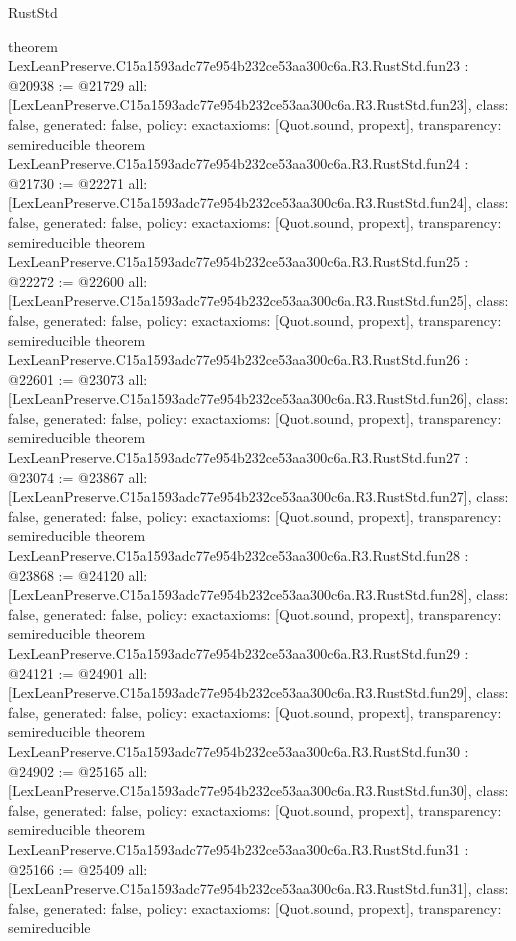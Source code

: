 \begin{lexlean}{RustStd}
\begin{coremodule}
{}
theorem LexLeanPreserve.C15a1593adc77e954b232ce53aa300c6a.R3.RustStd.fun23 : @20938 := @21729 {
  all: [LexLeanPreserve.C15a1593adc77e954b232ce53aa300c6a.R3.RustStd.fun23],
  class: false,
  generated: false,
  policy: exact{axioms: [Quot.sound, propext]},
  transparency: semireducible
}
theorem LexLeanPreserve.C15a1593adc77e954b232ce53aa300c6a.R3.RustStd.fun24 : @21730 := @22271 {
  all: [LexLeanPreserve.C15a1593adc77e954b232ce53aa300c6a.R3.RustStd.fun24],
  class: false,
  generated: false,
  policy: exact{axioms: [Quot.sound, propext]},
  transparency: semireducible
}
theorem LexLeanPreserve.C15a1593adc77e954b232ce53aa300c6a.R3.RustStd.fun25 : @22272 := @22600 {
  all: [LexLeanPreserve.C15a1593adc77e954b232ce53aa300c6a.R3.RustStd.fun25],
  class: false,
  generated: false,
  policy: exact{axioms: [Quot.sound, propext]},
  transparency: semireducible
}
theorem LexLeanPreserve.C15a1593adc77e954b232ce53aa300c6a.R3.RustStd.fun26 : @22601 := @23073 {
  all: [LexLeanPreserve.C15a1593adc77e954b232ce53aa300c6a.R3.RustStd.fun26],
  class: false,
  generated: false,
  policy: exact{axioms: [Quot.sound, propext]},
  transparency: semireducible
}
theorem LexLeanPreserve.C15a1593adc77e954b232ce53aa300c6a.R3.RustStd.fun27 : @23074 := @23867 {
  all: [LexLeanPreserve.C15a1593adc77e954b232ce53aa300c6a.R3.RustStd.fun27],
  class: false,
  generated: false,
  policy: exact{axioms: [Quot.sound, propext]},
  transparency: semireducible
}
theorem LexLeanPreserve.C15a1593adc77e954b232ce53aa300c6a.R3.RustStd.fun28 : @23868 := @24120 {
  all: [LexLeanPreserve.C15a1593adc77e954b232ce53aa300c6a.R3.RustStd.fun28],
  class: false,
  generated: false,
  policy: exact{axioms: [Quot.sound, propext]},
  transparency: semireducible
}
theorem LexLeanPreserve.C15a1593adc77e954b232ce53aa300c6a.R3.RustStd.fun29 : @24121 := @24901 {
  all: [LexLeanPreserve.C15a1593adc77e954b232ce53aa300c6a.R3.RustStd.fun29],
  class: false,
  generated: false,
  policy: exact{axioms: [Quot.sound, propext]},
  transparency: semireducible
}
theorem LexLeanPreserve.C15a1593adc77e954b232ce53aa300c6a.R3.RustStd.fun30 : @24902 := @25165 {
  all: [LexLeanPreserve.C15a1593adc77e954b232ce53aa300c6a.R3.RustStd.fun30],
  class: false,
  generated: false,
  policy: exact{axioms: [Quot.sound, propext]},
  transparency: semireducible
}
theorem LexLeanPreserve.C15a1593adc77e954b232ce53aa300c6a.R3.RustStd.fun31 : @25166 := @25409 {
  all: [LexLeanPreserve.C15a1593adc77e954b232ce53aa300c6a.R3.RustStd.fun31],
  class: false,
  generated: false,
  policy: exact{axioms: [Quot.sound, propext]},
  transparency: semireducible
}
\end{coremodule}
\end{lexlean}
